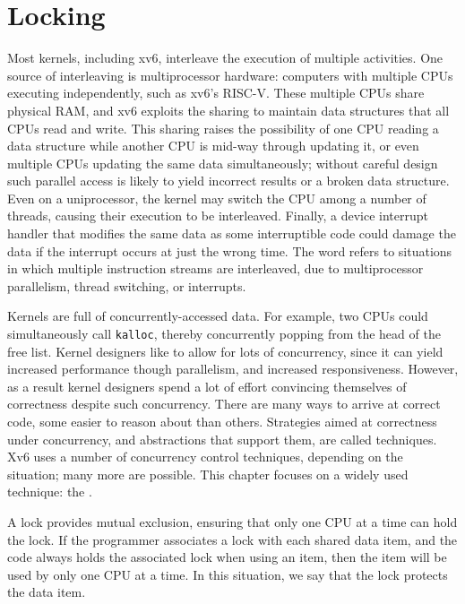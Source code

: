 \chapter{Locking}
\label{CH:LOCK}

Most kernels, including xv6, interleave the execution
of multiple activities.
One source of interleaving is multiprocessor hardware:
computers with
multiple CPUs executing independently, such as xv6's RISC-V.
These multiple CPUs share physical RAM,
and xv6 exploits the sharing to maintain
data structures that all CPUs read and write.
This sharing raises the possibility of
one CPU reading a data structure while another
CPU is mid-way through updating it, or even
multiple CPUs updating the same data simultaneously;
without careful design such parallel access is likely
to yield incorrect results or a broken data structure.
Even on a uniprocessor, the kernel may switch the CPU among
a number of threads, causing their execution to be interleaved.
Finally, a device interrupt handler that modifies
the same data as some interruptible code could damage
the data if the interrupt occurs at just the wrong time.
The word 
refers to situations in which
multiple instruction streams are interleaved,
due to multiprocessor parallelism,
thread switching, or interrupts.

Kernels are full of concurrently-accessed data. For example, two CPUs
could simultaneously call {\tt kalloc}, thereby concurrently
popping from the head of the free list. Kernel designers like to allow
for lots of concurrency, since it can yield increased performance
though parallelism, and increased responsiveness. However, as a result
kernel designers spend a lot of effort convincing themselves of
correctness despite such concurrency. There are many ways to arrive at
correct code, some easier to reason about than others. Strategies
aimed at correctness under concurrency, and abstractions that support
them, are called  techniques. Xv6 uses
a number of concurrency control techniques, depending on the
situation; many more are possible. This chapter focuses on a widely
used technique: the .

A lock provides mutual exclusion, ensuring that only one CPU at a time can hold
the lock. If the programmer associates a lock with each shared data item,
and the code always holds the associated lock when using an item,
then the item will be used by only one CPU at a time.
In this situation, we say that the lock protects the data item.

